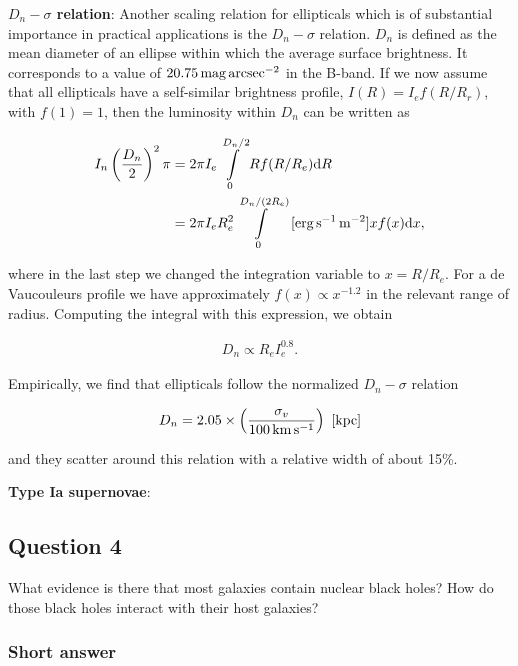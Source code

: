 \documentclass[a4paper,11pt]{article}
\begin{document}
{\noindent}\textbf{$D_n-\sigma$ relation}: Another scaling relation for ellipticals which is of substantial importance in practical applications is the $D_n-\sigma$ relation. $D_n$ is defined as the mean diameter of an ellipse within which the average surface brightness. It corresponds to a value of $20.75\,{\rm mag\,arcsec^{-2}}$ in the B-band. If we now assume that all ellipticals have a self-similar brightness profile, $I(R)=I_ef(R/R_r)$, with $f(1)=1$, then the luminosity within $D_n$ can be written as

\begin{align*}
    I_n\left(\frac{D_n}{2}\right)^2\pi &= 2\pi I_e \int\limits_0^{D_n/2} Rf(R/R_e)\mathrm{d}R \\
    &= 2\pi I_eR_e^2 \int\limits_0^{D_n/(2R_e)} ~ [{\rm erg\,s^{-1}\,m^{-2}}] xf(x)\mathrm{d}x,
\end{align*}

{\noindent}where in the last step we changed the integration variable to $x=R/R_e$. For a de Vaucouleurs profile we have approximately $f(x)\propto x^{-1.2}$ in the relevant range of radius. Computing the integral with this expression, we obtain

\begin{align*}
    D_n \propto R_eI_e^{0.8}.
\end{align*}

{\noindent}Empirically, we find that ellipticals follow the normalized $D_n-\sigma$ relation

\begin{align*}
    D_n = 2.05\times\left(\frac{\sigma_v}{100\,{\rm km\,s^{-1}}}\right) ~ [{\rm kpc}]
\end{align*}

{\noindent}and they scatter around this relation with a relative width of about 15\%.

{\noindent}\textbf{Type Ia supernovae}: 



\newpage
\subsection{Question 4}

What evidence is there that most galaxies contain nuclear black holes? How do those black holes interact with their host galaxies?

\subsubsection{Short answer}
\end{document}

